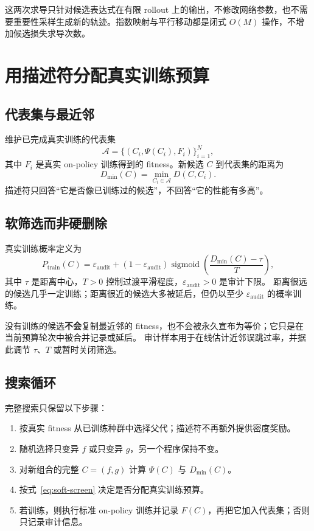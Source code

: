 \documentclass[UTF8,11pt]{ctexart}
\newcommand{\sigmoid}{\operatorname{sigmoid}}
\begin{document}
这两次求导只针对候选表达式在有限 rollout 上的输出，不修改网络参数，也不需要重要性采样生成新的轨迹。指数映射与平行移动都是闭式 $O(M)$ 操作，不增加候选损失求导次数。

\section{用描述符分配真实训练预算}

\subsection{代表集与最近邻}

维护已完成真实训练的代表集
\[
\mathcal A=\{(C_i,\Psi(C_i),F_i)\}_{i=1}^{N},
\]
其中 $F_i$ 是真实 on-policy 训练得到的 fitness。新候选 $C$ 到代表集的距离为
\[
D_{\min}(C)=\min_{C_i\in\mathcal A}D(C,C_i).
\]
描述符只回答“它是否像已训练过的候选”，不回答“它的性能有多高”。

\subsection{软筛选而非硬删除}

真实训练概率定义为
\begin{equation}
P_{\mathrm{train}}(C)=
\varepsilon_{\mathrm{audit}}+
(1-\varepsilon_{\mathrm{audit}})
\sigmoid\!\left(\frac{D_{\min}(C)-\tau}{T}\right),
\label{eq:soft-screen}
\end{equation}
其中 $\tau$ 是距离中心，$T>0$ 控制过渡平滑程度，$\varepsilon_{\mathrm{audit}}>0$ 是审计下限。
距离很远的候选几乎一定训练；距离很近的候选大多被延后，但仍以至少 $\varepsilon_{\mathrm{audit}}$ 的概率训练。

没有训练的候选\textbf{不会}复制最近邻的 fitness，也不会被永久宣布为等价；它只是在当前预算轮次中被合并记录或延后。
审计样本用于在线估计近邻误跳过率，并据此调节 $\tau$、$T$ 或暂时关闭筛选。

\subsection{搜索循环}

完整搜索只保留以下步骤：
\begin{enumerate}
  \item 按真实 fitness 从已训练种群中选择父代；描述符不再额外提供密度奖励。
  \item 随机选择只变异 $f$ 或只变异 $g$，另一个程序保持不变。
  \item 对新组合的完整 $C=(f,g)$ 计算 $\Psi(C)$ 与 $D_{\min}(C)$。
  \item 按式~\eqref{eq:soft-screen} 决定是否分配真实训练预算。
  \item 若训练，则执行标准 on-policy 训练并记录 $F(C)$，再把它加入代表集；否则只记录审计信息。
\end{enumerate}
\end{document}
